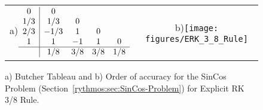 \begin{figure}[H]
\centering{}%
\begin{tabular}{cc}
a)$\begin{array}{c|cccc}
0 & 0\\
1/3 & 1/3 & 0\\
2/3 & -1/3 & 1 & 0\\
1 & 1 & -1 & 1 & 0\\
\hline  & 1/8 & 3/8 & 3/8 & 1/8
\end{array}$ & b)\texttt{[image: figures/ERK\_3\_8\_Rule]}\tabularnewline
\end{tabular}\caption{a) Butcher Tableau and b) Order of accuracy for the SinCos Problem
(Section~\ref{rythmos:sec:SinCos-Problem}) for Explicit RK 3/8 Rule.\label{rythmos:tab:ButcherTableau-ERK_3_8_Rule}}
\end{figure}

